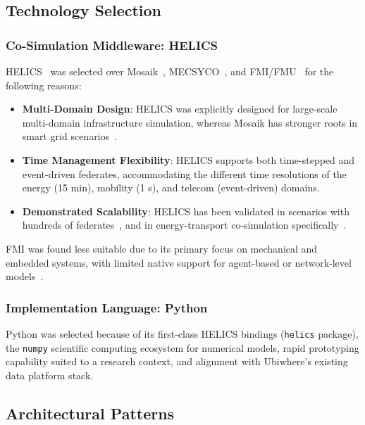 \subsection{Technology Selection}

\subsubsection{Co-Simulation Middleware: HELICS}

HELICS~\cite{helics} was selected over Mosaik~\cite{mosaik_cosim}, MECSYCO~\cite{mecsyco_framework}, and FMI/FMU~\cite{fmi_standard} for the following reasons:

\begin{itemize}
    \item \textbf{Multi-Domain Design}: HELICS was explicitly designed for large-scale multi-domain infrastructure simulation, whereas Mosaik has stronger roots in smart grid scenarios~\cite{mosaik_smartgrid}.
    \item \textbf{Time Management Flexibility}: HELICS supports both time-stepped and event-driven federates, accommodating the different time resolutions of the energy (15 min), mobility (1 s), and telecom (event-driven) domains.
    \item \textbf{Demonstrated Scalability}: HELICS has been validated in scenarios with hundreds of federates~\cite{helics_transactive}, and in energy-transport co-simulation specifically~\cite{helics_ev_transport}.
\end{itemize}

FMI was found less suitable due to its primary focus on mechanical and embedded systems, with limited native support for agent-based or network-level models~\cite{fmi_application}.

\subsubsection{Implementation Language: Python}

Python was selected because of its first-class HELICS bindings (\texttt{helics} package), the \texttt{numpy} scientific computing ecosystem for numerical models, rapid prototyping capability suited to a research context, and alignment with Ubiwhere's existing data platform stack.

\subsection{Architectural Patterns}

